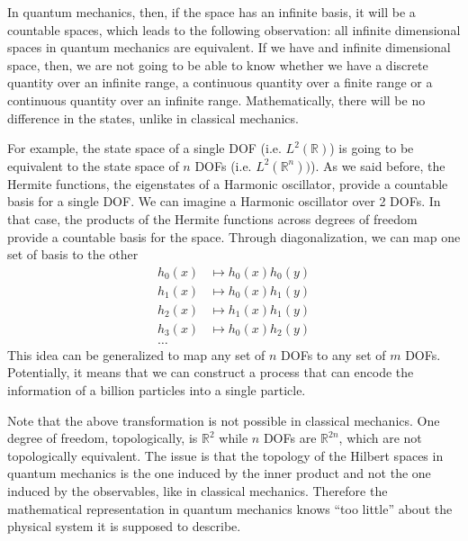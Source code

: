 In quantum mechanics, then, if the space has an infinite basis, it will be a countable spaces, which leads to the following observation: all infinite dimensional spaces in quantum mechanics are equivalent. If we have and infinite dimensional space, then, we are not going to be able to know whether we have a discrete quantity over an infinite range, a continuous quantity over a finite range or a continuous quantity over an infinite range. Mathematically, there will be no difference in the states, unlike in classical mechanics.

For example, the state space of a single DOF (i.e. $L^2(\mathbb{R})$) is going to be equivalent to the state space of $n$ DOFs (i.e. $L^2(\mathbb{R}^n))$). As we said before, the Hermite functions, the eigenstates of a Harmonic oscillator, provide a countable basis for a single DOF. We can imagine a Harmonic oscillator over 2 DOFs. In that case, the products of the Hermite functions across degrees of freedom provide a countable basis for the space. Through diagonalization, we can map one set of basis to the other
\begin{align}
	h_0(x) &\mapsto h_0(x)h_0(y) \\
	h_1(x) &\mapsto h_0(x)h_1(y) \\
	h_2(x) &\mapsto h_1(x)h_1(y) \\
	h_3(x) &\mapsto h_0(x)h_2(y) \\
	\dots
\end{align}
This idea can be generalized to map any set of $n$ DOFs to any set of $m$ DOFs. Potentially, it means that we can construct a process that can encode the information of a billion particles into a single particle.


Note that the above transformation is not possible in classical mechanics. One degree of freedom, topologically, is $\mathbb{R}^2$ while $n$ DOFs are $\mathbb{R}^{2n}$, which are not topologically equivalent. The issue is that the topology of the Hilbert spaces in quantum mechanics is the one induced by the inner product and not the one induced by the observables, like in classical mechanics. Therefore the mathematical representation in quantum mechanics knows ``too little'' about the physical system it is supposed to describe.

